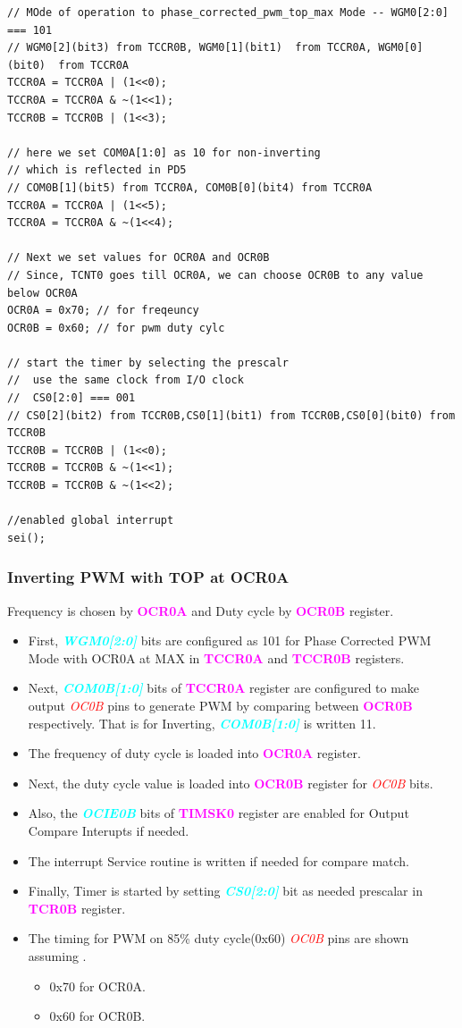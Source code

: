 \documentclass{article}
\newcommand{\bitFormat}[1]{\emph{\textbf{\textcolor{cyan}{#1}}}}
\newcommand{\regFormat}[1]{\textbf{\textcolor{magenta}{#1}}}
\newcommand{\pinFormat}[1]{\emph{\textcolor{red}{#1}}}
\begin{document}
\begin{verbatim}
// MOde of operation to phase_corrected_pwm_top_max Mode -- WGM0[2:0] === 101
// WGM0[2](bit3) from TCCR0B, WGM0[1](bit1)  from TCCR0A, WGM0[0](bit0)  from TCCR0A
TCCR0A = TCCR0A | (1<<0);
TCCR0A = TCCR0A & ~(1<<1);
TCCR0B = TCCR0B | (1<<3);		

// here we set COM0A[1:0] as 10 for non-inverting
// which is reflected in PD5
// COM0B[1](bit5) from TCCR0A, COM0B[0](bit4) from TCCR0A
TCCR0A = TCCR0A | (1<<5);
TCCR0A = TCCR0A & ~(1<<4);
    
// Next we set values for OCR0A and OCR0B
// Since, TCNT0 goes till OCR0A, we can choose OCR0B to any value below OCR0A
OCR0A = 0x70; // for freqeuncy
OCR0B = 0x60; // for pwm duty cylc

// start the timer by selecting the prescalr
//  use the same clock from I/O clock
//  CS0[2:0] === 001
// CS0[2](bit2) from TCCR0B,CS0[1](bit1) from TCCR0B,CS0[0](bit0) from TCCR0B
TCCR0B = TCCR0B | (1<<0);
TCCR0B = TCCR0B & ~(1<<1);
TCCR0B = TCCR0B & ~(1<<2);

//enabled global interrupt
sei();
\end{verbatim}

\subsubsection{Inverting PWM with TOP at  OCR0A}
\quad Frequency is chosen by \regFormat{OCR0A} and Duty cycle by \regFormat{OCR0B} register.
\begin{itemize}
    \item First, \bitFormat{WGM0[2:0]} bits are configured as 101 for Phase Corrected PWM Mode with OCR0A at MAX in \regFormat{TCCR0A} and \regFormat{TCCR0B} registers.
    \item Next,  \bitFormat{COM0B[1:0]} bits of \regFormat{TCCR0A} register are configured to make output \pinFormat{OC0B} pins to generate PWM by comparing between \regFormat{OCR0B} respectively. That is for Inverting, \bitFormat{COM0B[1:0]} is written 11.
    \item The frequency of duty cycle is loaded into \regFormat{OCR0A} register.
    \item Next, the duty cycle value is loaded into \regFormat{OCR0B} register for \pinFormat{OC0B} bits.
    \item Also, the \bitFormat{OCIE0B} bits of \regFormat{TIMSK0} register  are enabled for Output Compare Interupts if needed.
    \item The interrupt Service routine is written if needed for compare match.
    \item Finally, Timer is started by setting \bitFormat{CS0[2:0]} bit as needed prescalar in \regFormat{TCR0B} register.
    \item The timing for PWM on 85\% duty cycle(0x60)  \pinFormat{OC0B} pins are shown assuming .
    \begin{itemize}
        \item 0x70 for OCR0A.
        \item 0x60 for OCR0B.
    \end{itemize}
\end{itemize}
\end{document}
